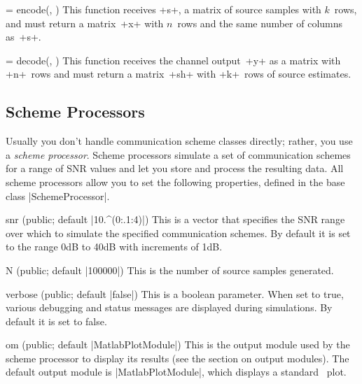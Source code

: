 \begin{method}{ = encode(\obj, )}
  This function receives +s+, a matrix of source samples with $k$~rows, and must
  return a matrix~+x+ with $n$~rows and the same number of columns as~+s+.
\end{method}

\begin{method}{ = decode(\obj, )}
  This function receives the channel output~+y+ as a matrix with +n+~rows and
  must return a matrix~+sh+ with +k+~rows of source estimates.
\end{method}


\subsection{Scheme Processors}

Usually you don't handle communication scheme classes directly; rather, you use
a \emph{scheme processor}. Scheme processors simulate a set of communication
schemes for a range of SNR values and let you store and process the resulting
data.  All scheme processors allow you to set the following properties, defined
in the base class |SchemeProcessor|.
\begin{property}{snr (public; default |10.^(0:.1:4)|)}
  This is a vector that specifies the SNR range over which to simulate the
  specified communication schemes. By default it is set to the range 0dB to 40dB
  with increments of 1dB. 
\end{property}

\begin{property}{N (public; default |100000|)}
  This is the number of source samples generated.
\end{property}
  
\begin{property}{verbose (public; default |false|)}
  This is a boolean parameter. When set to true, various debugging and status
  messages are displayed during simulations. By default it is set to false. 
\end{property}

\begin{property}{om (public; default |MatlabPlotModule|)}
  This is the output module used by the scheme processor to display its
  results (see the section on output modules). The default output module is
  |MatlabPlotModule|, which displays a standard
  \matlab\ plot.
\end{property}

